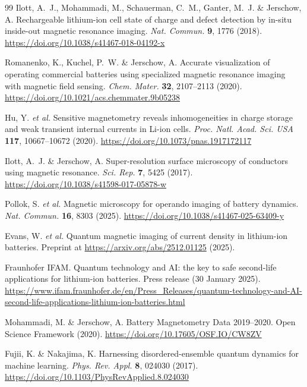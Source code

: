 \documentclass[11pt]{article}
\begin{document}
\begin{thebibliography}{99}
Ilott, A.~J., Mohammadi, M., Schauerman, C.~M., Ganter, M.~J. \& Jerschow, A.
Rechargeable lithium-ion cell state of charge and defect detection by in-situ
inside-out magnetic resonance imaging.
\emph{Nat. Commun.} \textbf{9}, 1776 (2018).
\url{https://doi.org/10.1038/s41467-018-04192-x}

Romanenko, K., Kuchel, P.~W. \& Jerschow, A.
Accurate visualization of operating commercial batteries using specialized
magnetic resonance imaging with magnetic field sensing.
\emph{Chem. Mater.} \textbf{32}, 2107--2113 (2020).
\url{https://doi.org/10.1021/acs.chemmater.9b05238}

Hu, Y. \emph{et al.}
Sensitive magnetometry reveals inhomogeneities in charge storage and weak
transient internal currents in Li-ion cells.
\emph{Proc. Natl. Acad. Sci. USA} \textbf{117}, 10667--10672 (2020).
\url{https://doi.org/10.1073/pnas.1917172117}

Ilott, A.~J. \& Jerschow, A.
Super-resolution surface microscopy of conductors using magnetic resonance.
\emph{Sci. Rep.} \textbf{7}, 5425 (2017).
\url{https://doi.org/10.1038/s41598-017-05878-w}

Pollok, S. \emph{et al.}
Magnetic microscopy for operando imaging of battery dynamics.
\emph{Nat. Commun.} \textbf{16}, 8303 (2025).
\url{https://doi.org/10.1038/s41467-025-63409-y}

Evans, W. \emph{et al.}
Quantum magnetic imaging of current density in lithium-ion batteries.
Preprint at \url{https://arxiv.org/abs/2512.01125} (2025).

\begingroup
\raggedright
Fraunhofer IFAM.
Quantum technology and AI: the key to safe second-life
applications for lithium-ion batteries.
Press release (30 January 2025).
\url{https://www.ifam.fraunhofer.de/en/Press_Releases/quantum-technology-and-AI-second-life-applications-lithium-ion-batteries.html}
\par
\endgroup

Mohammadi, M. \& Jerschow, A.
Battery Magnetometry Data 2019--2020.
Open Science Framework (2020).
\url{https://doi.org/10.17605/OSF.IO/CW8ZV}

Fujii, K. \& Nakajima, K.
Harnessing disordered-ensemble quantum dynamics for machine learning.
\emph{Phys. Rev. Appl.} \textbf{8}, 024030 (2017).
\url{https://doi.org/10.1103/PhysRevApplied.8.024030}


\end{thebibliography}
\end{document}
